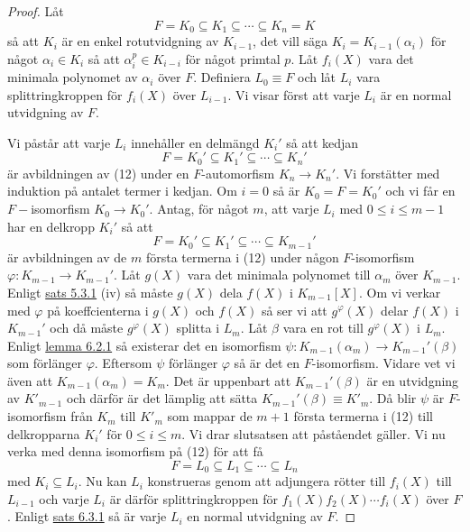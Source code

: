 \documentclass{article}
\theoremstyle{definition}
\begin{document}
\begin{proof}
  Låt
  \begin{equation}
    F = K_0 \subseteq K_1 \subseteq \cdots \subseteq K_n = K
  \end{equation}
  så att $K_i$ är en enkel rotutvidgning av $K_{i-1}$, det vill säga $K_i = K_{i-1}(\alpha_i)$ för något $\alpha_i \in K_i$ 
  så att  $\alpha_i^p \in K_{i-i}$ för något primtal $p$. Låt $f_i(X)$ vara det minimala polynomet av $\alpha_i$ över $F$. 
  Definiera $L_0 \equiv F$ och låt $L_i$ vara splittringkroppen för $f_i(X)$ över $L_{i-1}$. 
  Vi visar först att varje $L_i$ är en normal utvidgning av $F$.
  
  Vi påstår att varje $L_i$ innehåller en delmängd $K_i'$ så att kedjan
  \[F = K_0' \subseteq K_1' \subseteq \cdots \subseteq K_n'\]
  är avbildningen av (12) under en $F$-automorfism $K_n \rightarrow K_n'$. Vi forstätter med induktion på antalet termer i 
  kedjan. Om $i = 0$ så är $K_0 = F = K_0'$ och vi får en $F-$isomorfism $K_0 \rightarrow K_0'$.
  Antag, för något $m$, att varje $L_i$ med $0 \leq i \leq m -1$ har en delkropp $K_i'$ så att 
  \[F = K_0' \subseteq K_1' \subseteq \cdots \subseteq K_{m-1}'\]
  är avbildningen av de $m$ första termerna i (12) under någon $F$-isomorfism $\varphi: K_{m-1} \rightarrow K_{m-1}'$.
  Låt $g(X)$ vara det minimala polynomet till $\alpha_m$ över $K_{m-1}$. Enligt \hyperlink{minpol}{sats 5.3.1} (iv) så måste $g(X)$ dela 
  $f(X)$ i $K_{m-1}[X]$. Om vi verkar med $\varphi$ på koeffcienterna i $g(X)$ och $f(X)$ så ser vi att $g^\varphi(X)$ delar $f(X)$ i $K_{m-1}'$ och 
  då måste $g^\varphi(X)$ splitta i $L_{m}$. Låt $\beta$ vara en rot till $g^\varphi(X)$ i $L_m$. 
  Enligt \hyperlink{6.0.2}{lemma 6.2.1} så existerar det en isomorfism $\psi: K_{m-1}(\alpha_m) \rightarrow K_{m-1}'(\beta)$ som 
  förlänger $\varphi$. Eftersom $\psi$ förlänger $\varphi$ så är det en $F$-isomorfism. Vidare vet vi även att $K_{m-1}(\alpha_m) = K_m$. 
  Det är uppenbart att $K_{m-1}'(\beta)$ är en utvidgning av $K'_{m-1}$ och därför är det lämplig att sätta $K_{m-1}'(\beta) \equiv K'_{m}$. 
  Då blir $\psi$ är $F$-isomorfism från $K_{m}$ till $K'_{m}$ som mappar de $m+1$ första termerna i (12) till delkropparna $K_i'$ för $0 \leq i \leq m$. 
  Vi drar slutsatsen att påståendet gäller. Vi nu verka med denna isomorfism på (12) för att få 
  \[F = L_0 \subseteq L_1 \subseteq \cdots \subseteq L_n\]
  med $K_i \subseteq L_i$. Nu kan $L_i$ konstrueras genom att adjungera rötter till $f_i(X)$ till $L_{i-1}$
  och varje $L_i$ är därför splittringkroppen för $f_1(X)f_2(X)\cdots  f_i(X)$ över $F$. Enligt \hyperlink{sats6.3.1}{sats 6.3.1}
  så är varje $L_i$ en normal utvidgning av $F$.


\end{proof}
\end{document}
